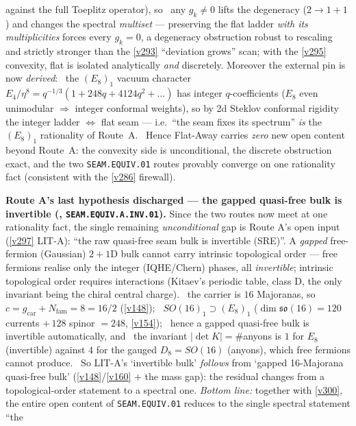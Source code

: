 \documentclass[11pt,a4paper]{article}
\newcommand{\Nfam}{N_{\mathrm{fam}}}
\begin{document}
\begin{keybox}
against the full Toeplitz operator), so \mE\ any $g_k\ne0$ lifts the degeneracy ($2\to1{+}1$) and changes the
spectral \emph{multiset} --- preserving the flat ladder \emph{with its multiplicities} forces every $g_k=0$, a
degeneracy obstruction robust to rescaling and strictly stronger than the \vref{v293} ``deviation grows'' scan;
with the \vref{v295} convexity, flat is isolated analytically \emph{and} discretely. Moreover the external pin is
now \emph{derived}: \mC\ the $(E_8)_1$ vacuum character $E_4/\eta^8=q^{-1/3}(1+248q+4124q^2+\dots)$ has integer
$q$-coefficients ($E_8$ even unimodular $\Rightarrow$ integer conformal weights), so by 2d Steklov conformal
rigidity the integer ladder $\Leftrightarrow$ flat seam --- i.e.\ ``the seam fixes its spectrum'' \emph{is} the
$(E_8)_1$ rationality of Route~A. \mO\ Hence Flat-Away carries \emph{zero} new open content beyond Route~A: the
convexity side is unconditional, the discrete obstruction exact, and the two \texttt{SEAM.EQUIV.01} routes
provably converge on one rationality fact (consistent with the \vref{v286} firewall).
\par\smallskip\noindent\textbf{Route A's last hypothesis discharged --- the gapped quasi-free bulk is
invertible (, \texttt{SEAM.EQUIV.A.INV.01}).} Since the two routes now meet
at one rationality fact, the single remaining \emph{unconditional} gap is Route A's open input (\vref{v297}
LIT-A): ``the raw quasi-free seam bulk is invertible (SRE)''. A \emph{gapped} free-fermion (Gaussian) $2{+}1$D
bulk cannot carry intrinsic topological order --- free fermions realise only the integer (IQHE/Chern) phases,
all \emph{invertible}; intrinsic topological order requires interactions (Kitaev's periodic table, class D, the
only invariant being the chiral central charge). \mE\ the carrier is $16$ Majoranas, so
$c=g_{\mathrm{car}}{+}\Nfam=8=16/2$ (\vref{v148}); \mE\ $SO(16)_1\supset(E_8)_1$ ($\dim\mathfrak{so}(16)=120$
currents $+\,128$ spinor $=248$, \vref{v154}); \mC\ hence a gapped quasi-free bulk is invertible
automatically, and \mE\ the invariant $|\det K|=\#$anyons is $1$ for $E_8$ (invertible) against $4$ for the
gauged $D_8{=}SO(16)$ (anyons), which free fermions cannot produce. \mO\ So LIT-A's `invertible bulk'
\emph{follows} from `gapped 16-Majorana quasi-free bulk' (\vref{v148}/\vref{v160} $+$ the mass gap): the
residual changes from a topological-order statement to a spectral one. \emph{Bottom line:} together with
\vref{v300}, the entire open content of \texttt{SEAM.EQUIV.01} reduces to the single spectral statement ``the

\end{keybox}
\end{document}
